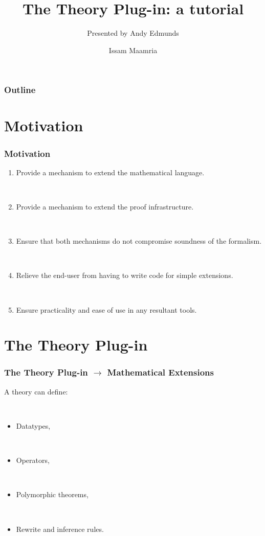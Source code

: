 \documentclass{beamer}
\title{The Theory Plug-in: a tutorial}
\subtitle{Presented by Andy Edmunds}
\author[I. Maamria]{Issam Maamria}
\institute{University of Southampton}
\begin{document}
\maketitle

\begin{frame} 
\frametitle{Outline}
\tableofcontents
\end{frame} 

\section{Motivation}
	\begin{frame}
		\frametitle{Motivation}
		\begin{enumerate}
			\item Provide a mechanism to extend the mathematical language.

~

			\item Provide a mechanism to extend the proof infrastructure.

~
			\item Ensure that both mechanisms do not compromise soundness of the formalism.

~
			\item Relieve the end-user from having to write code for simple extensions.

~
			\item Ensure practicality and ease of use in any resultant tools.
		\end{enumerate}
	\end{frame}

\section{The Theory Plug-in}
	\begin{frame}
		\frametitle{The Theory Plug-in $\rightarrow$ Mathematical Extensions}
\begin{center}
\begin{minipage}[t]{0.5\textwidth}
		A theory can define:	

~	

		\begin{itemize}
			\item Datatypes,

~

			\item Operators, 


~
			\item Polymorphic theorems, 

~
			\item Rewrite and inference rules.
		\end{itemize}
\end{minipage}
\end{center}
	\end{frame}
\end{document}

